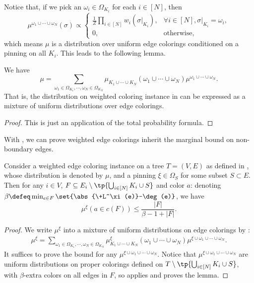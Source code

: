 \documentclass[a4paper,11pt]{article}
\begin{document}
Notice that, if we pick an $\omega_i\in\Omega_{K_i}$ for each $i\in [N]$,
then
\[\mu^{\omega_1\cup\cdots\cup \omega_N}(\sigma)
\propto
\begin{cases}
 \frac{1}{Z}   \prod_{i\in [N]} w_i(\sigma|_{K_i}),  &\forall i\in [N], \sigma|_{K_i} = \omega_i,
 \\ 0, & \text{otherwise},
\end{cases}
\]
which means $\mu$ is a distribution over uniform edge colorings conditioned on a 
pinning on all $K_i$. This leads to the following lemma.
\begin{lemma}\label{lem:weighted-decomposition-to-unweighted}
    We have
    \[
        \mu = \sum_{\omega_1\in \Omega_{K_1},\cdots, \omega_N\in \Omega_{K_N}}
        \mu_{K_1\cup\cdots\cup K_N}(\omega_1\cup\cdots\cup\omega_{N}) \mu^{\omega_1\cup\cdots\cup\omega_N}.
    \]
    That is, the distribution on weighted coloring instance in 
    can be expressed as a mixture of uniform distributions over edge colorings.
\end{lemma}
\begin{proof}
    This is just an application of the total probability formula.
\end{proof}

With , we can prove
weighted edge colorings inherit the marginal bound 
on non-boundary edges.
\begin{lemma}\label{lem:marginal-upper-weighted}
    Consider a weighted edge coloring instance on a tree $T=(V, E)$
    as defined in ,
    whose distribution is denoted by $\mu$, and a pinning $\xi\in \Omega_{S}$ for some subset $S\subset E$.
    Then for any $i\in V$, $F\subseteq E_i\setminus \tp{\bigcup_{i\in [N]}K_i\cup S}$ and color $a$:
    denoting $\beta\defeq\min_{e\in F}\set{\abs{\+L^\xi(e)}-\deg(e)}$, we have
    \[\mu^\xi(a\in c(F)) \le \frac{|F|}{\beta - 1 + |F|}.\]
\end{lemma}
\begin{proof}
    We write $\mu^\xi$ into a mixture of uniform distributions on edge colorings
    by :
    \begin{align*}
        \mu^\xi = \sum_{\omega_1\in \Omega_{K_1},\cdots, \omega_N\in \Omega_{K_N}}
        \mu^\xi_{K_1\cup\cdots\cup K_N}(\omega_1\cup\cdots\cup\omega_{N}) \mu^{\xi\cup\omega_1\cup\cdots\cup\omega_N}.
    \end{align*}
    It suffices to prove the bound for any $\mu^{\xi\cup\omega_1\cup\cdots\cup\omega_N}$.
    Notice that $\mu^{\xi\cup\omega_1\cup\cdots\cup\omega_N}$ are uniform distributions 
    on proper colorings defined on $T\setminus\tp{\bigcup_{i\in [N]}K_i\cup S}$, with $\beta$-extra colors 
    on all edges in $F$,
    so  applies and proves the lemma.
\end{proof}
\end{document}
